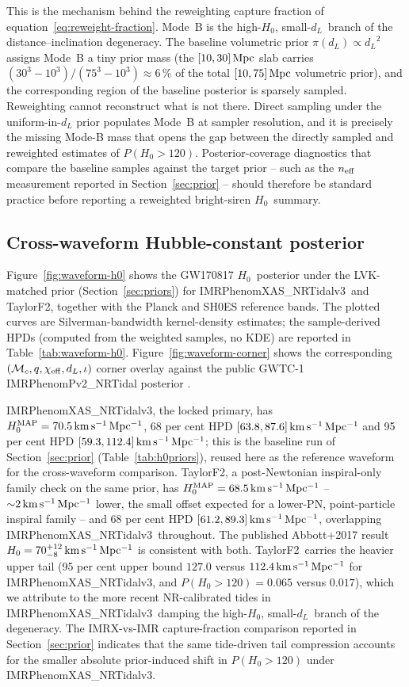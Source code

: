 \documentclass[usenatbib]{mnras}
\newcommand{\kmsmpc}{\ensuremath{\,\rm km\,s^{-1}\,Mpc^{-1}}\xspace}
\newcommand{\hzero}{\ensuremath{H_{0}}\xspace}
\newcommand{\dL}{\ensuremath{d_{L}}\xspace}
\newcommand{\IMRX}{IMRPhenomXAS\_NRTidalv3\xspace}
\newcommand{\TF}{TaylorF2\xspace}
\begin{document}
This is the mechanism behind the reweighting capture fraction of equation~\ref{eq:reweight-fraction}. Mode~B is the high-\hzero, small-\dL\ branch of the distance--inclination degeneracy. The baseline volumetric prior $\pi(\dL)\propto\dL^{2}$ assigns Mode~B a tiny prior mass (the $[10,30]\,\rm Mpc$ slab carries $(30^3-10^3)/(75^3-10^3)\approx 6\,\%$ of the total $[10,75]\,\rm Mpc$ volumetric prior), and the corresponding region of the baseline posterior is sparsely sampled. Reweighting cannot reconstruct what is not there. Direct sampling under the uniform-in-$d_L$ prior populates Mode~B at sampler resolution, and it is precisely the missing Mode-B mass that opens the gap between the directly sampled and reweighted estimates of $P(\hzero>120)$. Posterior-coverage diagnostics that compare the baseline samples against the target prior -- such as the $n_{\rm eff}$ measurement reported in Section~\ref{sec:prior} -- should therefore be standard practice before reporting a reweighted bright-siren \hzero\ summary.

\subsection{Cross-waveform Hubble-constant posterior}
\label{sec:cross-waveform}

Figure~\ref{fig:waveform-h0} shows the GW170817 \hzero\ posterior under the LVK-matched prior (Section~\ref{sec:priors}) for \IMRX\ and \TF, together with the Planck and SH0ES reference bands. The plotted curves are Silverman-bandwidth kernel-density estimates; the sample-derived HPDs (computed from the weighted samples, no KDE) are reported in Table~\ref{tab:waveform-h0}. Figure~\ref{fig:waveform-corner} shows the corresponding $(\mathcal{M}_{c},q,\chi_{\rm eff},\dL,\iota)$ corner overlay against the public GWTC-1 IMRPhenomPv2\_NRTidal posterior \citep{Abbott2019GWTC1,LVK_GW170817_DataRelease}.

\IMRX, the locked primary, has $\hzero^{\rm MAP}=70.5\kmsmpc$, 68 per cent HPD $[63.8,87.6]\kmsmpc$ and 95 per cent HPD $[59.3,112.4]\kmsmpc$; this is the baseline run of Section~\ref{sec:prior} (Table~\ref{tab:h0priors}), reused here as the reference waveform for the cross-waveform comparison. \TF, a post-Newtonian inspiral-only family check on the same prior, has $\hzero^{\rm MAP}=68.5\kmsmpc$ -- ${\sim}2\kmsmpc$ lower, the small offset expected for a lower-PN, point-particle inspiral family -- and 68 per cent HPD $[61.2,89.3]\kmsmpc$, overlapping \IMRX\ throughout. The published Abbott+2017 result $\hzero=70_{-8}^{+12}\kmsmpc$ \citep{Abbott2017H0} is consistent with both. \TF\ carries the heavier upper tail (95 per cent upper bound $127.0$ versus $112.4\kmsmpc$ for \IMRX, and $P(\hzero>120)=0.065$ versus $0.017$), which we attribute to the more recent NR-calibrated tides in \IMRX\ damping the high-\hzero, small-\dL\ branch of the degeneracy. The IMRX-vs-IMR capture-fraction comparison reported in Section~\ref{sec:prior} indicates that the same tide-driven tail compression accounts for the smaller absolute prior-induced shift in $P(\hzero>120)$ under \IMRX.
\end{document}
